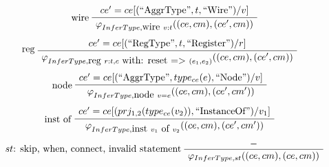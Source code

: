 \begin{table}[htbp]
  \footnotesize
  \begin{gather*}
    \infer[wire]
    {\seqq{\varphi_{InferType, \mbox{wire }v:t}((ce, cm), (ce', cm))}}
   {\seqq{ce' = ce [(\mbox{``AggrType''}, t, \mbox{``Wire''})/v]}}
    \\[1ex]
    \infer[reg]
    {\varphi_{InferType, \mbox{reg } r:t, c \mbox{ with: reset => }(e_1, e_2)}((ce, cm), (ce', cm))}
   {\seqq{ce' = ce [(\mbox{``RegType''}, t, \mbox{``Register''})/r]}}
    \quad
    \\[1ex]
    \infer[node]
    {\seqq{\varphi_{InferType, \mbox{node } v = e} ((ce, cm), (ce', cm'))}}
   {\seqq{ce' = ce[(\mbox{``AggrType''}, type_{ce}(e), \mbox{``Node''})/v]}}
    \quad
    \\[1ex]    
    \infer[inst of]
    {\varphi_{InferType, \mbox{inst } v_1 \mbox{ of } v_2} ((ce, cm), (ce', cm'))}
   {\seqq{ce' = ce[(prj_{1,2}(type_{ce}(v_2)), \mbox{``InstanceOf''})/v_1] }}
  \quad
    \\[1ex]    
    \infer[$st$: skip, when, connect, invalid statement]
    {\varphi_{InferType, st} ((ce, cm), (ce, cm))}
   {\seqq{-}}
  \end{gather*}
  \caption{Semantics of InferType compilation pass}
  \label{tab:infertype-sem}
\end{table}


